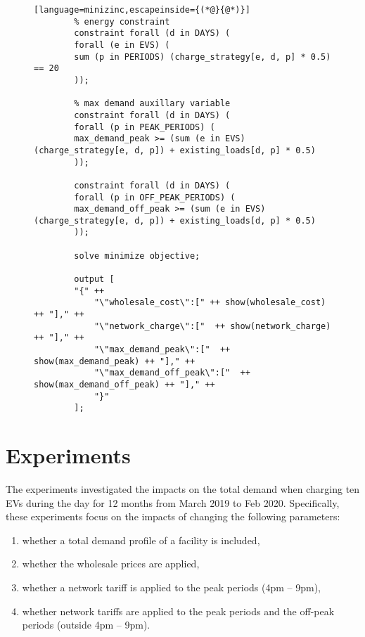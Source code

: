 \documentclass[a4paper, oneandhalfspace]{llncs}
\begin{document}
\begin{figure}[hp!]
\begin{lstlisting}[language=minizinc,escapeinside={(*@}{@*)}]
		% energy constraint
		constraint forall (d in DAYS) (
		forall (e in EVS) (
		sum (p in PERIODS) (charge_strategy[e, d, p] * 0.5) == 20
		));
		
		% max demand auxillary variable
		constraint forall (d in DAYS) (
		forall (p in PEAK_PERIODS) (
		max_demand_peak >= (sum (e in EVS) (charge_strategy[e, d, p]) + existing_loads[d, p] * 0.5)
		));
		
		constraint forall (d in DAYS) (
		forall (p in OFF_PEAK_PERIODS) (
		max_demand_off_peak >= (sum (e in EVS) (charge_strategy[e, d, p]) + existing_loads[d, p] * 0.5)
		));
		
		solve minimize objective;
		
		output [
		"{" ++
			"\"wholesale_cost\":[" ++ show(wholesale_cost) ++ "]," ++
			"\"network_charge\":["  ++ show(network_charge) ++ "]," ++
			"\"max_demand_peak\":["  ++ show(max_demand_peak) ++ "]," ++
			"\"max_demand_off_peak\":["  ++ show(max_demand_off_peak) ++ "]," ++
			"}"
		];
	\end{lstlisting}
\end{figure}


\section{Experiments}

The experiments investigated the impacts on the total demand when charging ten EVs during the day for 12 months from March 2019 to Feb 2020. Specifically, these experiments focus on the impacts of changing the following parameters:

\begin{enumerate}
	\item whether a total demand profile of a facility is included,
	\item whether the wholesale prices are applied,
	\item whether a network tariff is applied to the peak  periods (4pm -- 9pm),
	\item whether network tariffs are applied to the peak periods and the off-peak periods (outside 4pm -- 9pm).
\end{enumerate}
\end{document}
